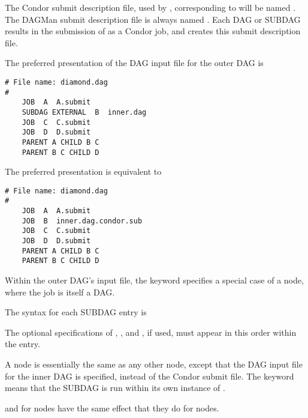 The Condor submit description file, used by ,
corresponding to  will be named
.  The DAGMan submit description file is always
named .
Each DAG or SUBDAG results in the submission of 
as a Condor job, and  creates this
submit description file.

The preferred presentation of the DAG input file for the outer DAG is
\begin{verbatim}
# File name: diamond.dag
#
    JOB  A  A.submit 
    SUBDAG EXTERNAL  B  inner.dag
    JOB  C  C.submit	
    JOB  D  D.submit
    PARENT A CHILD B C
    PARENT B C CHILD D
\end{verbatim}

The preferred presentation is equivalent to
\begin{verbatim}
# File name: diamond.dag
#
    JOB  A  A.submit 
    JOB  B  inner.dag.condor.sub
    JOB  C  C.submit	
    JOB  D  D.submit
    PARENT A CHILD B C
    PARENT B C CHILD D
\end{verbatim}

Within the outer DAG's input file,
the  keyword specifies a special case of a 
node, where the job is itself a DAG.

The syntax for each SUBDAG entry is

   
  

The optional specifications of , , and ,
if used, must appear in this order within the entry.

A  node is essentially the same as any other node,
except that the DAG input file for the inner DAG is specified,
instead of the Condor submit file.
The keyword  means that the
SUBDAG is run within its own instance of .

 and  for  nodes have the same effect
that they do for  nodes.

